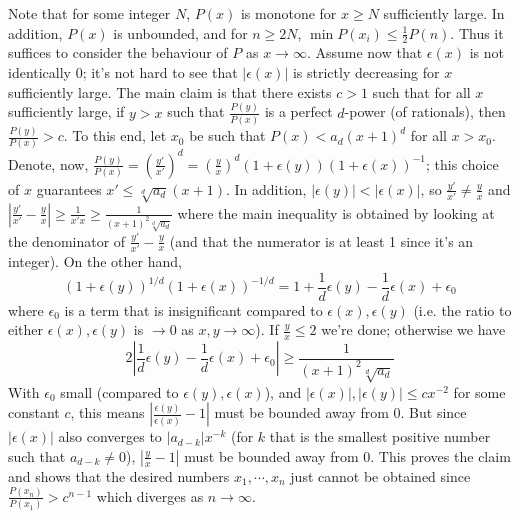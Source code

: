 \documentclass[11pt,a4paper]{article}
\begin{document}
\begin{itemize}
Note that for some integer $N$, $P(x)$ is monotone for $x\ge N$ sufficiently large. In addition, 
$P(x)$ is unbounded, and for $n\ge 2N$, $\min P(x_i) \le \frac{1}{2}P(n)$. 
Thus it suffices to consider the behaviour of $P$ as $x\to\infty$. 
Assume now that $\epsilon(x)$ is not identically 0; it's not hard to see that $|\epsilon(x)|$ is strictly decreasing for $x$ sufficiently large. 
The main claim is that there exists $c > 1$ such that for all $x$ sufficiently large, 
if $y > x$ such that $\frac{P(y)}{P(x)}$ is a perfect $d$-power (of rationals), 
then $\frac{P(y)}{P(x)} > c$. 
To this end, let $x_0$ be such that $P(x) < a_d(x+1)^d$ for all $x > x_0$. 
Denote, now, $\frac{P(y)}{P(x)} = (\frac{y'}{x'})^d = (\frac{y}{x})^d (1+\epsilon(y))(1+\epsilon(x))^{-1}$; this choice of $x$ guarantees $x'\le \sqrt[d]{a_d}(x+1)$.
In addition, $|\epsilon(y)| < |\epsilon(x)|$, 
so $\frac{y'}{x'} \neq \frac{y}{x}$ and $|\frac{y'}{x'}-\frac{y}{x}|\ge \frac{1}{x'x}\ge\frac{1}{(x+1)^2\sqrt[d]{a_d}}$ 
where the main inequality is obtained by looking at the denominator of $\frac{y'}{x'}-\frac{y}{x}$ (and that the numerator is at least 1 since it's an integer). 
On the other hand, 
\[
(1+\epsilon(y))^{1/d}(1+\epsilon(x))^{-1/d}
=1 + \frac{1}{d}\epsilon(y) - \frac{1}{d}\epsilon(x) + \epsilon_0
\]
where $\epsilon_0$ is a term that is insignificant compared to $\epsilon(x), \epsilon(y)$ 
(i.e. the ratio to either $\epsilon(x), \epsilon(y)$ is $\to 0$ as $x, y\to\infty$). 
If $\frac{y}{x}\le 2$ we're done; 
otherwise we have 
\[
2|\frac{1}{d}\epsilon(y) - \frac{1}{d}\epsilon(x) + \epsilon_0|\ge \frac{1}{(x+1)^2 \sqrt[d]{a_d}}
\]
With $\epsilon_0$ small (compared to $\epsilon(y), \epsilon(x)$), 
and $|\epsilon(x)|, |\epsilon(y)|\le cx^{-2}$ for some constant $c$, 
this means $|\frac{\epsilon(y)}{\epsilon(x)}-1|$ must be bounded away from 0. 
But since $|\epsilon(x)|$ also converges to $|a_{d-k}|x^{-k}$ (for $k$ that is the smallest positive number such that $a_{d-k}\neq 0$), 
$ |\frac{y}{x}-1|$ must be bounded away from 0. 
This proves the claim and shows that the desired numbers $x_1, \cdots, x_n$ just cannot be obtained since $\frac{P(x_n)}{P(x_1)} > c^{n-1}$ which diverges as $n\to\infty$. 
\end{itemize}
\end{document}
